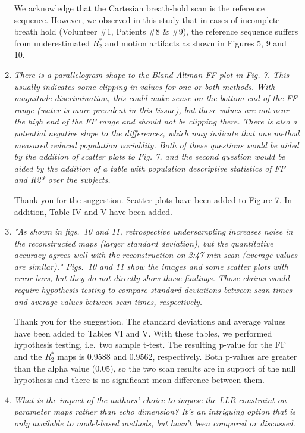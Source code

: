 \documentclass[a4paper,11pt]{report}
\begin{document}
\begin{enumerate}
\hspace{1em} We acknowledge that the Cartesian breath-hold scan is the reference sequence. 
However, we observed in this study that in cases of incomplete breath hold 
(Volunteer \#1, Patients \#8 \& \#9), 
the reference sequence suffers from underestimated $R_2^*$ and motion artifacts
as shown in Figures 5, 9 and 10.

	\item \textit{There is a parallelogram shape to the Bland-Altman FF plot in Fig. 7. This usually indicates some clipping in values for one or both methods. With magnitude discrimination, this could make sense on the bottom end of the FF range (water is more prevalent in this tissue), but these values are not near the high end of the FF range and should not be clipping there. There is also a potential negative slope to the differences, which may indicate that one method measured reduced population variablity. Both of these questions would be aided by the addition of scatter plots to Fig. 7, and the second question would be aided by the addition of a table with population descriptive statistics of FF and R2* over the subjects.}

\hspace{1em} Thank you for the suggestion. 
Scatter plots have been added to Figure 7. In addition, Table IV and V have been added.

	\item \textit{"As shown in figs.~10 and 11, retrospective undersampling increases noise in the reconstructed maps (larger standard deviation), but the quantitative accuracy agrees well with the reconstruction on 2:47 min scan (average values are similar)." Figs.~10 and 11 show the images and some scatter plots with error bars, but they do not directly show those findings. Those claims would require hypothesis testing to compare standard deviations between scan times and average values between scan times, respectively.}

\hspace{1em} Thank you for the suggestion. 
The standard deviations and average values have been added to Tables VI and V. 
With these tables, we performed hypothesis testing, i.e.~two sample t-test. 
The resulting p-value for the FF and the $R_2^*$ maps is 0.9588 and 0.9562, respectively.
Both p-values are greater than the alpha value (0.05), 
so the two scan results are in support of the null hypothesis 
and there is no significant mean difference between them.

	\item \textit{What is the impact of the authors' choice to impose the LLR constraint on parameter maps rather than echo dimension? It's an intriguing option that is only available to model-based methods, but hasn't been compared or discussed.}


\end{enumerate}
\end{document}
